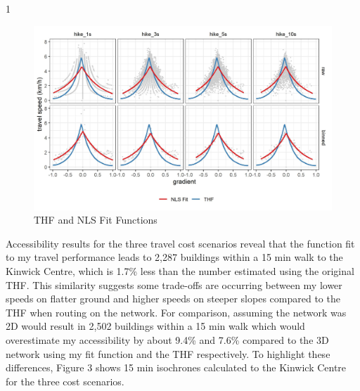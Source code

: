 \documentclass{article}
\begin{document}
\begin{table}[ht]
\begin{centerbox}
\begin{threeparttable}
\begin{tabularx}{1\textwidth}
 \tabularnewline[-0.5pt]


\hhline{}
\end{tabularx}
\end{threeparttable}\par\end{centerbox}

\end{table}
 

\begin{figure}
\includegraphics[width=1\linewidth]{./img/Fig_2} \caption{THF and NLS Fit Functions}\label{fig:fig 2}
\end{figure}

Accessibility results for the three travel cost scenarios reveal that
the function fit to my travel performance leads to 2,287 buildings
within a 15 min walk to the Kinwick Centre, which is 1.7\% less than the
number estimated using the original THF. This similarity suggests some
trade-offs are occurring between my lower speeds on flatter ground and
higher speeds on steeper slopes compared to the THF when routing on the
network. For comparison, assuming the network was 2D would result in
2,502 buildings within a 15 min walk which would overestimate my
accessibility by about 9.4\% and 7.6\% compared to the 3D network using
my fit function and the THF respectively. To highlight these
differences, Figure 3 shows 15 min isochrones calculated to the Kinwick
Centre for the three cost scenarios.
\end{document}

